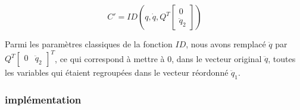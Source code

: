 \documentclass{report}
\begin{document}
\begin{equation}
C'=ID \left( q,\dot{q},Q^T
\begin{bmatrix}
  0 \\
  \ddot{q}_2
\end{bmatrix} \right)
\end{equation}

Parmi les paramètres classiques de la fonction $ID$, nous avons remplacé $\ddot{q}$ par 
\(Q^T \begin{bmatrix} 0 & \ddot{q}_2 \end{bmatrix}^T\), 
ce qui correspond à mettre à 0, dans le vecteur original $\ddot{q}$, toutes les variables qui étaient regroupées dans le vecteur réordonné $\ddot{q}_1$.\\


\subsubsection{implémentation}
\end{document}
